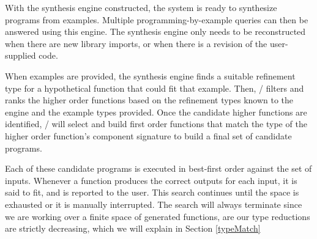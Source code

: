 With the synthesis engine constructed, the system is ready to synthesize programs from examples.
Multiple programming-by-example queries can then be answered using this engine.
The synthesis engine only needs to be reconstructed when there are new library imports, or when there is a revision of the user-supplied code.

When examples are provided, the synthesis engine finds a suitable refinement type for a hypothetical function that could fit that example.
Then, \ourTool/ filters and ranks the higher order functions based on the refinement types known to the engine and the example types provided.
Once the candidate higher functions are identified, \ourTool/ will select and build first order functions that match the type of the higher order function's component signature to build a final set of candidate programs.

Each of these candidate programs is executed in best-first order against the set of inputs.
Whenever a function produces the correct outputs for each input, it is said to fit, and is reported to the user.
This search continues until the space is exhausted or it is manually interrupted. 
The search will always terminate since we are working over a finite space of generated functions, are our type reductions are strictly decreasing, which we will explain in Section \ref{typeMatch}








